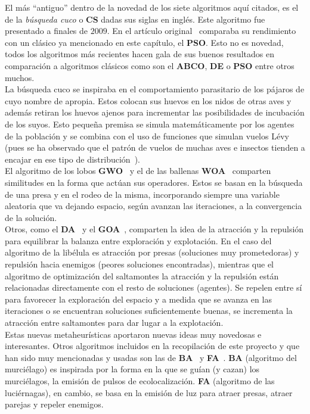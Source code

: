 El más ``antiguo'' dentro de la novedad de los siete algoritmos aquí citados, es el de la \textit{búsqueda cuco} o \textbf{CS} dadas sus siglas en inglés. Este algoritmo fue presentado a finales de $2009$. En el artículo original~\cite{yang_cuckoo_2010} comparaba su rendimiento con un clásico ya mencionado en este capítulo, el \textbf{PSO}. Esto no es novedad, todos los algoritmos más recientes hacen gala de sus buenos resultados en comparación a algoritmos clásicos como son el \textbf{ABCO}, \textbf{DE} o \textbf{PSO} entre otros muchos.\\[6pt]
La búsqueda cuco se inspiraba en el comportamiento parasitario de los pájaros de cuyo nombre de apropia. Estos colocan sus huevos en los nidos de otras aves y además retiran los huevos ajenos para incrementar las posibilidades de incubación de los suyos. Esto pequeña premisa se simula matemáticamente por los agentes de la población y se combina con el uso de funciones que simulan vuelos Lévy (pues se ha observado que el patrón de vuelos de muchas aves e insectos tienden a encajar en ese tipo de distribución~\cite{GUY2008585}).\\[6pt]
El algoritmo de los lobos \textbf{GWO}~\cite{mirjalili_grey_2014} y el de las ballenas \textbf{WOA}~\cite{mirjalili_whale_2016} comparten similitudes en la forma que actúan sus operadores. Estos se basan en la búsqueda de una presa y en el rodeo de la misma, incorporando siempre una variable aleatoria que va dejando espacio, según avanzan las iteraciones, a la convergencia de la solución.\\[6pt]
Otros, como el \textbf{DA}~\cite{mirjalili_dragonfly_2016} y el \textbf{GOA}~\cite{saremi_grasshopper_2017}, comparten la idea de la atracción y la repulsión para equilibrar la balanza entre exploración y explotación. En el caso del algoritmo de la libélula es atracción por presas (soluciones muy prometedoras) y repulsión hacia enemigos (peores soluciones encontradas), mientras que el algoritmo de optimización del saltamontes la atracción y la repulsión están relacionadas directamente con el resto de soluciones (agentes). Se repelen entre sí para favorecer la exploración del espacio y a medida que se avanza en las iteraciones o se encuentran soluciones suficientemente buenas, se incrementa la atracción entre saltamontes para dar lugar a la explotación.\\[6pt]
Estas nuevas metaheurísticas aportaron nuevas ideas muy novedosas e interesantes.
Otros algoritmos incluidos en la recopilación de este proyecto y que han sido muy mencionadas y usadas son las de \textbf{BA}~\cite{yang_new_2010} y \textbf{FA}~\cite{yang_chapter_2014}. \textbf{BA} (algoritmo del murciélago) es inspirada por la forma en la que se guían (y cazan) los murciélagos, la emisión de pulsos de ecolocalización. \textbf{FA} (algoritmo de las luciérnagas), en cambio, se basa en la emisión de luz para atraer presas, atraer parejas y repeler enemigos.\\[6pt]

